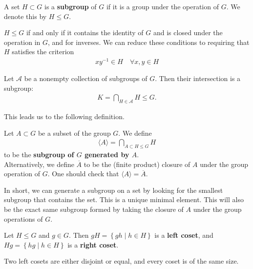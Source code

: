\documentclass{memoir}
\begin{document}
\begin{defn}[Subgroup]
	A set \(H \subset G\) is a \textbf{subgroup} of \(G\) if it is a group under the operation of \(G\). We denote this by \(H \leq G\).
\end{defn}

\(H\leq G\) if and only if it contains the identity of \(G\) and is closed under the operation in \(G\), and for inverses. We can reduce these conditions to requiring that \(H\) satisfies the criterion
\begin{align*}
	xy^{-1} \in H \quad \forall x,y \in H
\end{align*}

\begin{prop}
	Let \(\mathcal{A}\) be a nonempty collection of subgroups of \(G\). Then their intersection is a subgroup:
	\begin{align*}
		K = \bigcap_{H \in \mathcal{A}} H \leq G.
	\end{align*}
\end{prop}
This leads us to the following definition.
\begin{defn}
	Let \(A\subset G\) be a subset of the group \(G\). We define
	\begin{align*}
		\langle A \rangle = \bigcap_{A\subset H\leq G} H
	\end{align*}
	to be the \textbf{subgroup of \(G\) generated by \(A\)}.\\

	Alternatively, we define \(\overline{A}\) to be the (finite product) closure of \(A\) under the group operation of \(G\). One should check that \(\langle A \rangle = \overline{A}\).
\end{defn}
In short, we can generate a subgroup on a set by looking for the smallest subgroup that contains the set. This is a unique minimal element. This will also be the exact same subgroup formed by taking the closure of \(A\) under the group operations of \(G\).

\begin{defn}[Coset]
	Let \(H\leq G\) and \(g \in G\). Then \(gH = \left\{gh \mid h \in H \right\} \) is a \textbf{left coset}, and \(Hg = \left\{hg \mid h \in H \right\} \) is a \textbf{right coset}.
\end{defn}

Two left cosets are either disjoint or equal, and every coset is of the same size.
\end{document}
